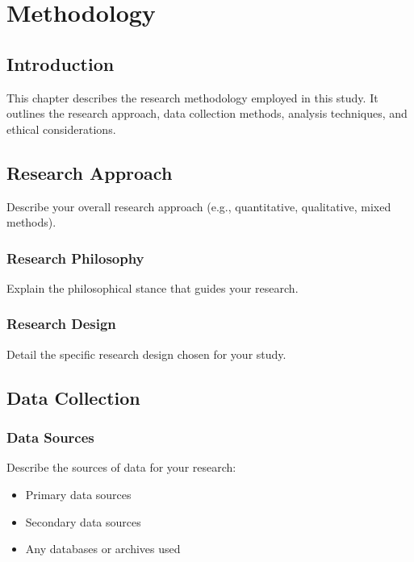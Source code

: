 \chapter{Methodology}

\section{Introduction}

This chapter describes the research methodology employed in this study. It outlines the research approach, data collection methods, analysis techniques, and ethical considerations.

\section{Research Approach}

Describe your overall research approach (e.g., quantitative, qualitative, mixed methods).

\subsection{Research Philosophy}

Explain the philosophical stance that guides your research.

\subsection{Research Design}

Detail the specific research design chosen for your study.

\section{Data Collection}

\subsection{Data Sources}

Describe the sources of data for your research:

\begin{itemize}
    \item Primary data sources
    \item Secondary data sources
    \item Any databases or archives used
\end{itemize}

